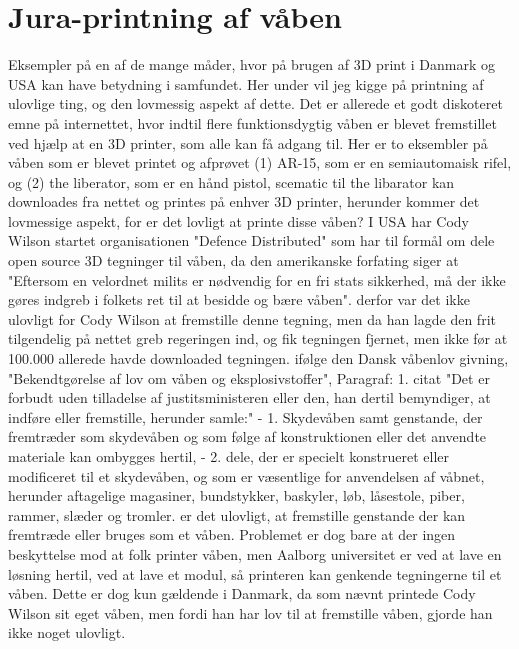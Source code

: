 \chapter{Jura-printning af våben}
Eksempler på en af de mange måder, hvor på brugen af 3D print i Danmark og USA kan have betydning i samfundet. Her under vil jeg kigge på printning af ulovlige ting, og den lovmessig aspekt af dette. Det er allerede et godt diskoteret emne på internettet, hvor indtil flere funktionsdygtig våben er blevet fremstillet ved hjælp at en 3D printer, som alle kan få adgang til. Her er to eksembler på våben som er blevet printet og afprøvet (1) AR-15, som er en semiautomaisk rifel, og (2) the liberator, som er en hånd pistol, scematic til the libarator kan downloades fra nettet og printes på enhver 3D printer, herunder kommer det lovmessige aspekt, for er det lovligt at printe disse våben?
I USA har Cody Wilson startet organisationen "Defence Distributed" som har til formål om dele open source 3D tegninger til våben, da den amerikanske forfating siger at "Eftersom en velordnet milits er nødvendig for en fri stats sikkerhed, må der ikke gøres indgreb i folkets ret til at besidde og bære våben". derfor var det ikke ulovligt for Cody Wilson at fremstille denne tegning, men da han lagde den frit tilgendelig på nettet greb regeringen ind, og fik tegningen fjernet, men ikke før at 100.000 allerede havde downloaded tegningen.
ifølge den Dansk våbenlov givning, "Bekendtgørelse af lov om våben og eksplosivstoffer", 
Paragraf: 1. citat "Det er forbudt uden tilladelse af justitsministeren eller den, han dertil bemyndiger, at indføre eller fremstille, herunder samle:" 
- 1. Skydevåben samt genstande, der fremtræder som skydevåben og som følge af konstruktionen eller det anvendte materiale kan ombygges hertil,
- 2. dele, der er specielt konstrueret eller modificeret til et skydevåben, og som er væsentlige for anvendelsen af våbnet, herunder aftagelige magasiner, bundstykker, baskyler, løb, låsestole, piber, rammer, slæder og tromler.
er det ulovligt, at fremstille genstande der kan fremtræde eller bruges som et våben. Problemet er dog bare at der ingen beskyttelse mod at folk printer våben, men Aalborg universitet er ved at lave en løsning hertil, ved at lave et modul, så printeren kan genkende tegningerne til et våben. Dette er dog kun gældende i Danmark, da som nævnt printede Cody Wilson sit eget våben, men fordi han har lov til at fremstille våben, gjorde han ikke noget ulovligt.
